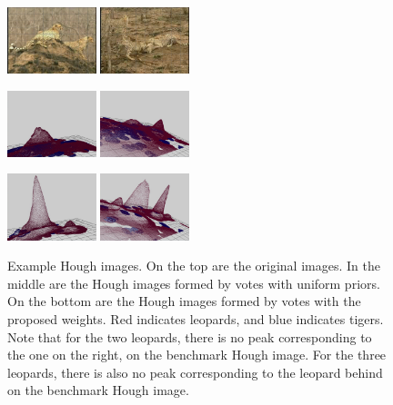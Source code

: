 \documentclass{mva2011}
\begin{document}
\begin{figure}
\centering


\includegraphics[width=0.23\textwidth,bb=0 0 640 480]{PER1.jpg}
\includegraphics[width=0.23\textwidth,bb=0 0 640 480]{PER2.jpg}

\includegraphics[width=0.23\textwidth,bb=0 0 640 480]{1.jpg}
\includegraphics[width=0.23\textwidth,bb=0 0 640 480]{3.jpg}

\includegraphics[width=0.23\textwidth,bb=0 0 640 480]{2.jpg}
\includegraphics[width=0.23\textwidth,bb=0 0 640 480]{4.jpg}


\caption{Example Hough images. On the top are the original images. In the middle are the Hough images formed by votes with uniform priors. On the bottom are the Hough images formed by votes with the proposed weights. Red indicates leopards, and blue indicates tigers. Note that for the two leopards, there is no peak corresponding to the one on the right, on the benchmark Hough image. For the three leopards, there is also no peak corresponding to the leopard behind on the benchmark Hough image.}
\label{fig:BcHi}
\end{figure}
\end{document}
